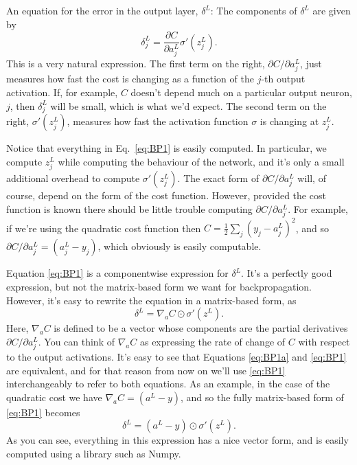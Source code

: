 \documentclass[a4paper,twoside,10pt]{book}
\begin{document}
An equation for the error in the output layer, $\delta^L$: The components of $\delta^L$ are given by
\begin{equation}
	\delta^L_j = \frac{\partial C}{\partial a^L_j} \sigma'(z^L_j).
	\tag{BP1}
	\label{eq:BP1}
\end{equation}
This is a very natural expression. The first term on the right, $\partial{}C/\partial{}a^L_j$, just measures how fast the cost is changing as a function of the $j$-th output activation. If, for example, $C$ doesn't depend much on a particular output neuron, $j$, then $\delta^L_j$ will be small, which is what we'd expect. The second term on the right, $\sigma'(z^L_j)$, measures how fast the activation function $\sigma$ is changing at $z^L_j$.

Notice that everything in Eq.~\ref{eq:BP1} is easily computed. In particular, we compute $z^L_j$ while computing the behaviour of the network, and it's only a small additional overhead to compute $\sigma'(z^L_j)$. The exact form of $\partial{}C/\partial{}a^L_j$ will, of course, depend on the form of the cost function. However, provided the cost function is known there should be little trouble computing $\partial{}C/\partial{}a^L_j$. For example, if we're using the quadratic cost function then $C=\frac12\sum_j(y_j-a^L_j)^2$, and so $\partial{}C/\partial{}a^L_j=(a^L_j-y_j)$, which obviously is easily computable.

Equation \ref{eq:BP1} is a componentwise expression for $\delta^L$. It's a perfectly good expression, but not the matrix-based form we want for backpropagation. However, it's easy to rewrite the equation in a matrix-based form, as
\begin{equation}
\delta^L = \nabla_a C \odot \sigma'(z^L).
\tag{BP1a}
\label{eq:BP1a}
\end{equation}
Here, $\nabla_a C$ is defined to be a vector whose components are the partial derivatives $\partial{}C/\partial{}a^L_j$. You can think of $\nabla_a C$ as expressing the rate of change of $C$ with respect to the output activations. It's easy to see that Equations \ref{eq:BP1a} and \ref{eq:BP1} are equivalent, and for that reason from now on we'll use \ref{eq:BP1} interchangeably to refer to both equations. As an example, in the case of the quadratic cost we have $\nabla_a C =(a^L-y)$, and so the fully matrix-based form of \ref{eq:BP1} becomes
\begin{equation}
\delta^L = (a^L-y) \odot \sigma'(z^L).
\tag{30}
\label{eq:30}
\end{equation}
As you can see, everything in this expression has a nice vector form, and is easily computed using a library such as Numpy.
\end{document}
